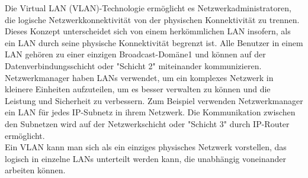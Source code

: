         Die Virtual LAN (VLAN)-Technologie ermöglicht es Netzwerkadministratoren, 
        die logische Netzwerkkonnektivität von der physischen Konnektivität zu trennen. 
        Dieses Konzept unterscheidet sich von einem herkömmlichen LAN insofern, als ein LAN 
        durch seine physische Konnektivität begrenzt ist. Alle Benutzer in einem LAN gehören 
        zu einer einzigen Broadcast-Domäne1 und können auf der Datenverbindungsschicht oder 
        "Schicht 2" miteinander kommunizieren. Netzwerkmanager haben LANs verwendet, um ein 
        komplexes Netzwerk in kleinere Einheiten aufzuteilen, um es besser verwalten zu können 
        und die Leistung und Sicherheit zu verbessern. Zum Beispiel verwenden Netzwerkmanager 
        ein LAN für jedes IP-Subnetz in ihrem Netzwerk. Die Kommunikation zwischen den Subnetzen 
        wird auf der Netzwerkschicht oder "Schicht 3" durch IP-Router ermöglicht.\\
        Ein VLAN kann man sich als ein einziges physisches Netzwerk vorstellen, das logisch in 
        einzelne LANs unterteilt werden kann, die unabhängig voneinander arbeiten können.

